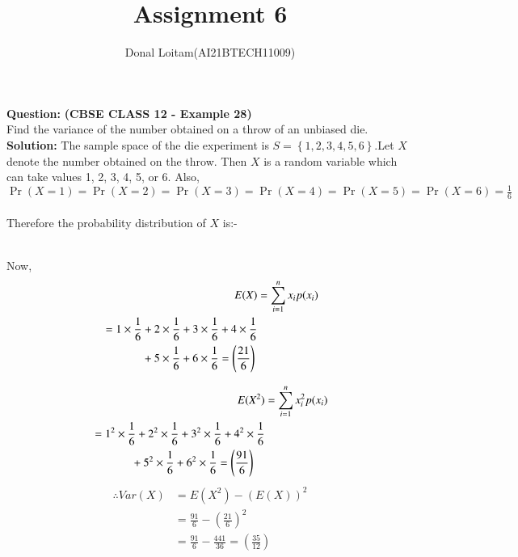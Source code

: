 \documentclass[journal,12pt,twocolumn]{IEEEtran}
\title{Assignment 6}
\author{Donal Loitam(AI21BTECH11009)}
\date{}
\providecommand{\pr}[1]{\ensuremath{\Pr\left(#1\right)}}
\providecommand{\brak}[1]{\ensuremath{\left(#1\right)}}
\providecommand{\cbrak}[1]{\ensuremath{\left\{#1\right\}}}
\newcommand{\question}{\noindent \textbf{Question: }}
\begin{document}
\maketitle
\question \textbf{(CBSE CLASS 12 - Example 28)}\\
Find the variance of the number obtained on a throw of an unbiased die.\\
\textbf{Solution:} The sample space of the die experiment is $S=\cbrak{1,2,3,4,5,6}$.Let $X$ denote the number obtained on the throw. Then $X$ is a random variable
which can take values 1, 2, 3, 4, 5, or 6. Also,  \\
$\pr{X = 1} = \pr{X = 2} = \pr{X = 3} = \pr{X = 4} =\pr{X = 5} = \pr{X = 6} = \frac{1}{6}$ \\\\
Therefore the probability distribution of $X$ is:-
\begin{table}[ht!]
\begin{center}
		
		\vspace*{5pt}
		\caption{}
		\label{table:table}
\end{center}	
	\end{table}\\
Now,
 \begin{align}
 E(X) &=  \sum_{i=1}^{n} x_{i}p(x_{i})\\
      \begin{split}
      &=  1\times \frac{1}{6} + 2\times \frac{1}{6} + 3\times \frac{1}{6} + 4\times \frac{1}{6} \\
      &\hspace{3.5em} + 5\times \frac{1}{6} + 6\times \frac{1}{6} = \brak{\frac{21}{6}} \\
      \end{split}
 \end{align}
 
 \begin{align}
 E(X^{2}) &=  \sum_{i=1}^{n} x_{i}^{2}p(x_{i})\\
      \begin{split}
      &=  1^{2}\times \frac{1}{6} + 2^{2}\times \frac{1}{6} + 3^{2}\times \frac{1}{6} + 4^{2}\times \frac{1}{6} \\
      &\hspace{3.5em} + 5^{2}\times \frac{1}{6} + 6^{2}\times \frac{1}{6} = \brak{\frac{91}{6}} \\
      \end{split}
 \end{align}
 \begin{align}
 \therefore Var(X) &= E(X^{2})-(E(X))^{2}\\
              &=\frac{91}{6}-\brak{\frac{21}{6}}^{2}\\
              &=\frac{91}{6} - \frac{441}{36} = \brak{\frac{35}{12}} 
 \end{align}
\end{document}
